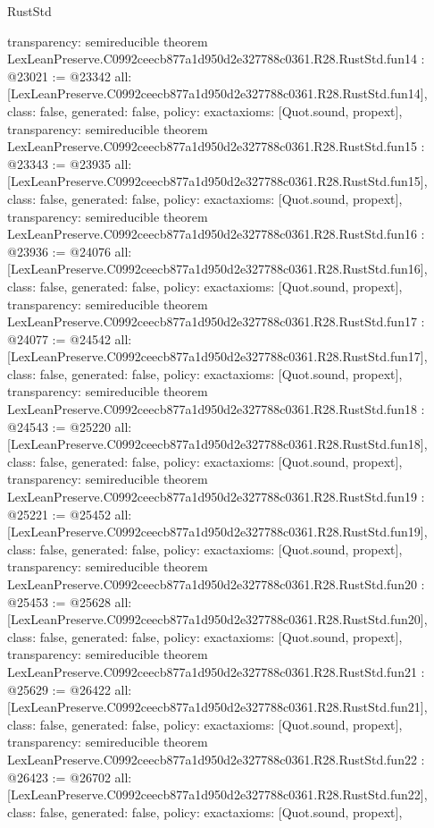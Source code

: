 \begin{lexlean}{RustStd}
\begin{coremodule}
{  transparency: semireducible
}
theorem LexLeanPreserve.C0992ceecb877a1d950d2e327788c0361.R28.RustStd.fun14 : @23021 := @23342 {
  all: [LexLeanPreserve.C0992ceecb877a1d950d2e327788c0361.R28.RustStd.fun14],
  class: false,
  generated: false,
  policy: exact{axioms: [Quot.sound, propext]},
  transparency: semireducible
}
theorem LexLeanPreserve.C0992ceecb877a1d950d2e327788c0361.R28.RustStd.fun15 : @23343 := @23935 {
  all: [LexLeanPreserve.C0992ceecb877a1d950d2e327788c0361.R28.RustStd.fun15],
  class: false,
  generated: false,
  policy: exact{axioms: [Quot.sound, propext]},
  transparency: semireducible
}
theorem LexLeanPreserve.C0992ceecb877a1d950d2e327788c0361.R28.RustStd.fun16 : @23936 := @24076 {
  all: [LexLeanPreserve.C0992ceecb877a1d950d2e327788c0361.R28.RustStd.fun16],
  class: false,
  generated: false,
  policy: exact{axioms: [Quot.sound, propext]},
  transparency: semireducible
}
theorem LexLeanPreserve.C0992ceecb877a1d950d2e327788c0361.R28.RustStd.fun17 : @24077 := @24542 {
  all: [LexLeanPreserve.C0992ceecb877a1d950d2e327788c0361.R28.RustStd.fun17],
  class: false,
  generated: false,
  policy: exact{axioms: [Quot.sound, propext]},
  transparency: semireducible
}
theorem LexLeanPreserve.C0992ceecb877a1d950d2e327788c0361.R28.RustStd.fun18 : @24543 := @25220 {
  all: [LexLeanPreserve.C0992ceecb877a1d950d2e327788c0361.R28.RustStd.fun18],
  class: false,
  generated: false,
  policy: exact{axioms: [Quot.sound, propext]},
  transparency: semireducible
}
theorem LexLeanPreserve.C0992ceecb877a1d950d2e327788c0361.R28.RustStd.fun19 : @25221 := @25452 {
  all: [LexLeanPreserve.C0992ceecb877a1d950d2e327788c0361.R28.RustStd.fun19],
  class: false,
  generated: false,
  policy: exact{axioms: [Quot.sound, propext]},
  transparency: semireducible
}
theorem LexLeanPreserve.C0992ceecb877a1d950d2e327788c0361.R28.RustStd.fun20 : @25453 := @25628 {
  all: [LexLeanPreserve.C0992ceecb877a1d950d2e327788c0361.R28.RustStd.fun20],
  class: false,
  generated: false,
  policy: exact{axioms: [Quot.sound, propext]},
  transparency: semireducible
}
theorem LexLeanPreserve.C0992ceecb877a1d950d2e327788c0361.R28.RustStd.fun21 : @25629 := @26422 {
  all: [LexLeanPreserve.C0992ceecb877a1d950d2e327788c0361.R28.RustStd.fun21],
  class: false,
  generated: false,
  policy: exact{axioms: [Quot.sound, propext]},
  transparency: semireducible
}
theorem LexLeanPreserve.C0992ceecb877a1d950d2e327788c0361.R28.RustStd.fun22 : @26423 := @26702 {
  all: [LexLeanPreserve.C0992ceecb877a1d950d2e327788c0361.R28.RustStd.fun22],
  class: false,
  generated: false,
  policy: exact{axioms: [Quot.sound, propext]},
}
\end{coremodule}
\end{lexlean}
